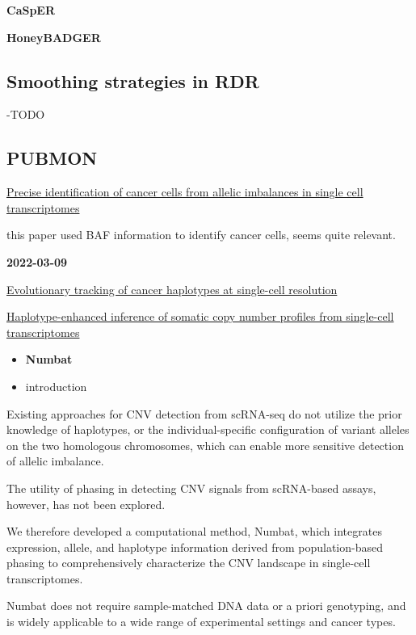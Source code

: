 \documentclass[
]{book}
\begin{document}
\textbf{CaSpER}

\textbf{HoneyBADGER}

\hypertarget{smoothing-strategies-in-rdr}{%
\subsection{Smoothing strategies in RDR}\label{smoothing-strategies-in-rdr}}

-TODO

\hypertarget{pubmon}{%
\subsection{PUBMON}\label{pubmon}}

\href{https://www.biorxiv.org/content/10.1101/2021.11.25.469995v1}{Precise identification of cancer cells from allelic imbalances in single cell transcriptomes}

this paper used BAF information to identify cancer cells, seems quite relevant.

\textbf{2022-03-09}

\href{https://www.biorxiv.org/content/10.1101/2021.06.04.447031v1.full}{Evolutionary tracking of cancer haplotypes at single-cell resolution}

\href{https://www.biorxiv.org/content/10.1101/2022.02.07.479314v1.full}{Haplotype-enhanced inference of somatic copy number profiles from single-cell transcriptomes}

\begin{itemize}
\item
  \textbf{Numbat}
\item
  introduction
\end{itemize}

Existing approaches for CNV detection from scRNA-seq do not utilize the prior knowledge of haplotypes, or the individual-specific configuration of variant alleles on the two homologous chromosomes, which can enable more sensitive detection of allelic imbalance.

The utility of phasing in detecting CNV signals from scRNA-based assays, however, has not been explored.

We therefore developed a computational method, Numbat, which integrates expression, allele, and haplotype information derived from population-based phasing to comprehensively characterize the CNV landscape in single-cell transcriptomes.

Numbat does not require sample-matched DNA data or a priori genotyping, and is widely applicable to a wide range of experimental settings and cancer types.
\end{document}
